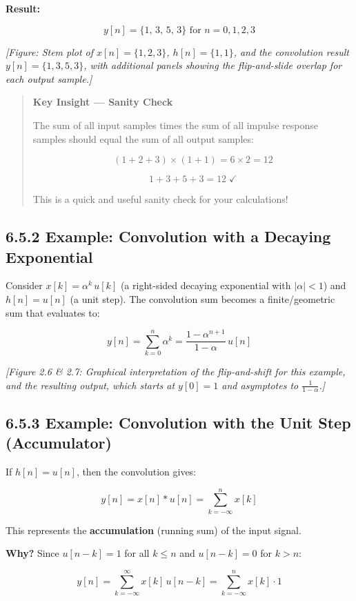 \documentclass[11pt]{article}
\begin{document}
\textbf{Result:}

\[\boxed{\,y[n] = \{1,\,3,\,5,\,3\}\text{ for }n=0,1,2,3\,}\]

\textit{[Figure: Stem plot of $x[n]=\{1,2,3\}$, $h[n]=\{1,1\}$, and the convolution result $y[n]=\{1,3,5,3\}$, with additional panels showing the flip-and-slide overlap for each output sample.]}

\begin{quote}
\textbf{Key Insight — Sanity Check}

The sum of all input samples times the sum of all impulse response samples should equal the sum of all output samples:

\[(1+2+3)\times(1+1) = 6\times 2 = 12\]

\[1 + 3 + 5 + 3 = 12\;\checkmark\]

This is a quick and useful sanity check for your calculations!
\end{quote}

\subsection*{6.5.2 Example: Convolution with a Decaying Exponential}

Consider $x[k] = \alpha^k\,u[k]$ (a right-sided decaying exponential with $|\alpha|<1$) and $h[n] = u[n]$ (a unit step). The convolution sum becomes a finite/geometric sum that evaluates to:

\[y[n] = \sum_{k=0}^{n} \alpha^k = \frac{1 - \alpha^{n+1}}{1 - \alpha}\,u[n]\]

\textit{[Figure 2.6 \& 2.7: Graphical interpretation of the flip-and-shift for this example, and the resulting output, which starts at $y[0]=1$ and asymptotes to $\tfrac{1}{1-\alpha}$.]}

\subsection*{6.5.3 Example: Convolution with the Unit Step (Accumulator)}

If $h[n] = u[n]$, then the convolution gives:

\[y[n] = x[n]*u[n] = \sum_{k=-\infty}^{n} x[k]\]

This represents the \textbf{accumulation} (running sum) of the input signal.

\textbf{Why?} Since $u[n-k] = 1$ for all $k \leq n$ and $u[n-k] = 0$ for $k > n$:

\[y[n] = \sum_{k=-\infty}^{\infty} x[k]\,u[n-k] = \sum_{k=-\infty}^{n} x[k]\cdot 1\]
\end{document}
